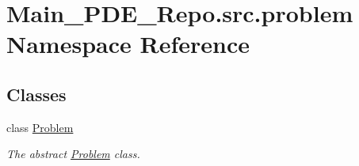 \hypertarget{namespaceMain__PDE__Repo_1_1src_1_1problem}{}\section{Main\+\_\+\+P\+D\+E\+\_\+\+Repo.\+src.\+problem Namespace Reference}
\label{namespaceMain__PDE__Repo_1_1src_1_1problem}
\subsection*{Classes}
\begin{DoxyCompactItemize}
\item 
class \hyperlink{classMain__PDE__Repo_1_1src_1_1problem_1_1Problem}{Problem}
\begin{DoxyCompactList}\small\item\em The abstract \hyperlink{classMain__PDE__Repo_1_1src_1_1problem_1_1Problem}{Problem} class. \end{DoxyCompactList}\end{DoxyCompactItemize}
